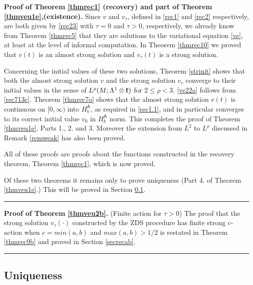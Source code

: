 \documentclass[12pt]{article}
\newenvironment{proof}[1][Proof]{\textbf{#1.} }{\ \rule{0.5em}{0.5em}}
\def \L{\Lambda}
\def \As{\mathsf{A}}
\def \kf{\frak k}
\def \eref{\eqref}
\numberwithin{equation}{section}
\begin{document}
\noindent
    \begin{proof}[Proof of Theorem \ref{thmrec1} (recovery) and part of Theorem \ref{thmveu1e},(existence)] 
     Since $ v$ and $v_\tau$, defined in \eref{rec1} and \eref{rec2} respectively,  
     are both given by \eref{rec23} 
     with $\tau =0$ and $\tau >0$, respectively,
     we already know from Theorem \ref{thmrec5} that  they  
    are  solutions to the variational equation \eref{ve},
     at least at the level of informal computation. 
           In Theorem \ref{thmrec10} we proved that $v(t)$ is an almost strong solution
     and $v_\tau(t)$ is a strong solution.     
 
 
 Concerning the initial values of these two solutions, Theorem \ref{strinit} 
 shows that both the almost strong solution $v$ and the strong solution $v_\tau$ converge
  to their initial values in the  sense of $L^\rho(M; \L^1\otimes \kf)$ for $2 \le \rho < 3$.
  \eref{ve22a} follows from \eref{rec713c}.
    Theorem \ref{thmrec7o}  shows that the almost
 strong solution $v(t)$ is continuous on $[0, \infty)$ into $H_b^\As$,  as required in \eref{rec1.1},
  and in particular   converges to its correct initial value $v_0$  in $H_b^\As$ norm. 
 This completes the proof of Theorem \ref{thmveu1e}, Parts 1., 2. and 3.  Moreover the extension from
 $L^2$ to $L^\rho$ discussed in Remark \ref{remweak} has also been proved.
 
 All of these proofs are proofs about  the functions constructed in the recovery theorem,
  Theorem \ref{thmrec1}, which is now proved.
  
  Of these two theorems it remains only to prove uniqueness (Part 4.  of Theorem \ref{thmveu1e}.)
  This will be proved in Section \ref{secrecu}.
\end{proof}  
  
 

\bigskip
\noindent
\begin{proof}[Proof of Theorem \ref{thmveu2b}]   (Finite action for  $\tau >0$)
The proof that the strong solution $v_\tau(\cdot)$ constructed by the ZDS procedure has 
 finite strong c-action when $c = min(a,b)$
 and $max(a,b) > 1/2$ is restated in Theorem \ref{thmrec9b} and proved in Section \ref{secrecab}. 
\end{proof}


\subsection{Uniqueness} \label{secrecu}
\end{document}
